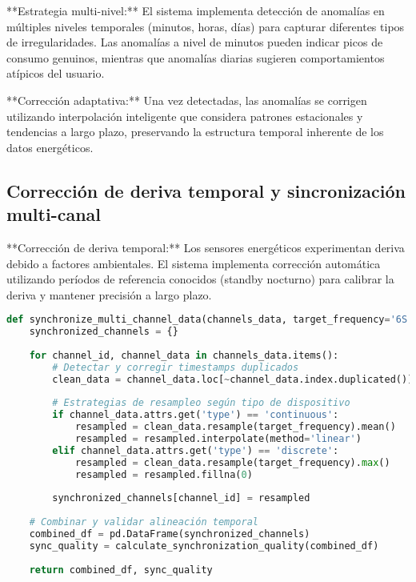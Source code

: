 **Estrategia multi-nivel:** El sistema implementa detección de anomalías en múltiples niveles temporales (minutos, horas, días) para capturar diferentes tipos de irregularidades. Las anomalías a nivel de minutos pueden indicar picos de consumo genuinos, mientras que anomalías diarias sugieren comportamientos atípicos del usuario.

**Corrección adaptativa:** Una vez detectadas, las anomalías se corrigen utilizando interpolación inteligente que considera patrones estacionales y tendencias a largo plazo, preservando la estructura temporal inherente de los datos energéticos.

\subsection{Corrección de deriva temporal y sincronización multi-canal}

**Corrección de deriva temporal:** Los sensores energéticos experimentan deriva debido a factores ambientales. El sistema implementa corrección automática utilizando períodos de referencia conocidos (standby nocturno) para calibrar la deriva y mantener precisión a largo plazo.

\begin{lstlisting}[language=Python, caption=Pipeline de sincronización temporal]
def synchronize_multi_channel_data(channels_data, target_frequency='6S'):
    synchronized_channels = {}
    
    for channel_id, channel_data in channels_data.items():
        # Detectar y corregir timestamps duplicados
        clean_data = channel_data.loc[~channel_data.index.duplicated()]
        
        # Estrategias de resampleo según tipo de dispositivo
        if channel_data.attrs.get('type') == 'continuous':
            resampled = clean_data.resample(target_frequency).mean()
            resampled = resampled.interpolate(method='linear')
        elif channel_data.attrs.get('type') == 'discrete':
            resampled = clean_data.resample(target_frequency).max()
            resampled = resampled.fillna(0)
        
        synchronized_channels[channel_id] = resampled
    
    # Combinar y validar alineación temporal
    combined_df = pd.DataFrame(synchronized_channels)
    sync_quality = calculate_synchronization_quality(combined_df)
    
    return combined_df, sync_quality
\end{lstlisting}

